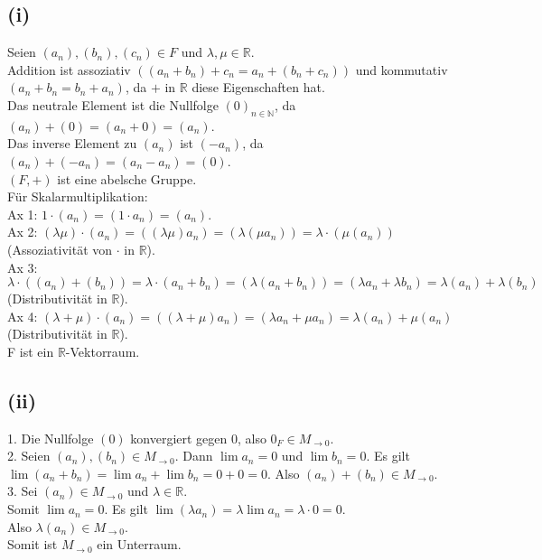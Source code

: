 \documentclass{article}
\begin{document}
\subsection*{(i)} 
Seien $(a_n), (b_n), (c_n) \in F$ und $\lambda, \mu \in \mathbb{R}$. \\
Addition ist assoziativ $((a_n+b_n)+c_n = a_n+(b_n+c_n))$ und kommutativ $(a_n+b_n = b_n+a_n)$, da $+$ in $\mathbb{R}$ diese Eigenschaften hat. \\
Das neutrale Element ist die Nullfolge $(0)_{n\in\mathbb{N}}$, da $(a_n) + (0) = (a_n+0) = (a_n)$. \\
Das inverse Element zu $(a_n)$ ist $(-a_n)$, da $(a_n) + (-a_n) = (a_n-a_n) = (0)$. \\
$(F,+)$ ist eine abelsche Gruppe. \\
Für Skalarmultiplikation: \\
Ax 1: $1 \cdot (a_n) = (1 \cdot a_n) = (a_n)$. \\
Ax 2: $(\lambda \mu) \cdot (a_n) = ((\lambda \mu) a_n) = (\lambda (\mu a_n)) = \lambda \cdot (\mu (a_n))$ (Assoziativität von $\cdot$ in $\mathbb{R}$).\\
Ax 3: $\lambda \cdot ((a_n)+(b_n)) = \lambda \cdot (a_n+b_n) = (\lambda(a_n+b_n)) = (\lambda a_n + \lambda b_n) = \lambda(a_n) + \lambda(b_n)$ (Distributivität in $\mathbb{R}$).\\
Ax 4: $(\lambda + \mu) \cdot (a_n) = ((\lambda + \mu) a_n) = (\lambda a_n + \mu a_n) = \lambda (a_n) + \mu (a_n)$ (Distributivität in $\mathbb{R}$).\\
F ist ein $\mathbb{R}$-Vektorraum.

\subsection*{(ii)}
1. Die Nullfolge $(0)$ konvergiert gegen 0, also $0_F \in M_{\rightarrow 0}$. \\
2. Seien $(a_n), (b_n) \in M_{\rightarrow 0}$. Dann $\lim a_n = 0$ und $\lim b_n = 0$. Es gilt $\lim (a_n + b_n) = \lim a_n + \lim b_n = 0 + 0 = 0$. Also $(a_n) + (b_n) \in M_{\rightarrow 0}$. \\
3. Sei $(a_n) \in M_{\rightarrow 0}$ und $\lambda \in \mathbb{R}$. \\
Somit $\lim a_n = 0$. Es gilt $\lim (\lambda a_n) = \lambda \lim a_n = \lambda \cdot 0 = 0$. \\
Also $\lambda (a_n) \in M_{\rightarrow 0}$. \\
Somit ist $M_{\rightarrow 0}$ ein Unterraum.
\end{document}
